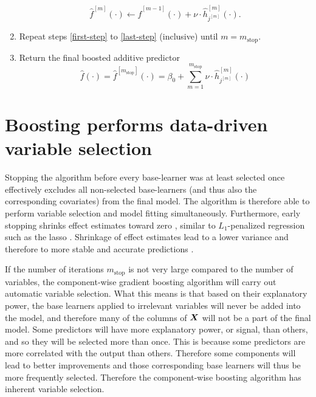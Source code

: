 \begin{algorithm}
\begin{enumerate}
        \begin{equation}
            \hat{f}^{[m]}(\cdot)\gets \hat{f}^{[m-1]}(\cdot)+\nu\cdot \hat{h}_{j^{[m]}}^{[m]}(\cdot).
        \end{equation}
    \item Repeat steps \ref{first-step} to \ref{last-step} (inclusive) until $m=m_{\text{stop}}$.
    \item Return the final boosted additive predictor
        \begin{equation}
            \hat{f}(\cdot)=\hat{f}^{[m_{\text{stop}}]}(\cdot)=\beta_0+\sum_{m=1}^{m_{\text{stop}}}\nu\cdot\hat{h}_{j^{[m]}}^{[m]}(\cdot)
        \end{equation}
\end{enumerate}
\end{algorithm}

\section{Boosting performs data-driven variable selection}\label{sec:variable-selection}
Stopping the algorithm before every base-learner was at least selected once effectively excludes all non-selected base-learners
(and thus also the corresponding covariates) from the final model.
The algorithm is therefore able to perform variable selection and model fitting simultaneously.
Furthermore, early stopping shrinks effect estimates toward zero \citep{buhlmann2007, DeBin2016}, similar to $L_1$-penalized regression
such as the lasso \citep{lasso, efron2004}.
Shrinkage of effect estimates lead to a lower variance and therefore to more stable and accurate predictions \citep{efron1975, copas1983, ESL}.


If the number of iterations $m_{\text{stop}}$ is not very large compared to the number of variables, the component-wise gradient boosting algorithm will carry out automatic variable selection. What this means is that based on their explanatory power, the base learners applied to irrelevant variables will never be added into the model, and therefore many of the columns of $\bm{X}$ will not be a part of the final model. Some predictors will have more explanatory power, or signal, than others, and so they will be selected more than once. This is because some predictors are more correlated with the output than others. Therefore some components will lead to better improvements and those corresponding base learners will thus be more frequently selected. Therefore the component-wise boosting algorithm has inherent variable selection.


